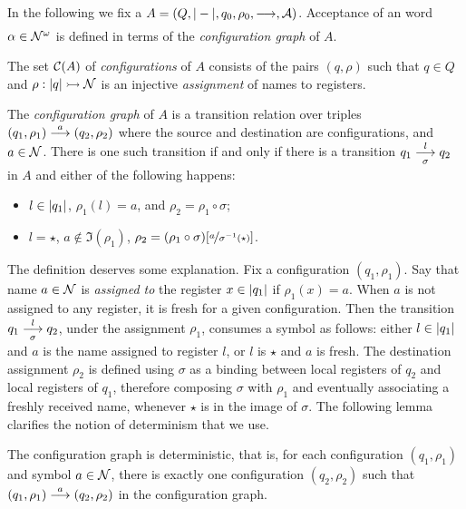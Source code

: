 In the following we fix a \hdma{} $A = (Q,|-|,q_0,\rho_0,\overset{}{\underset{}{\longrightarrow}},\mathcal{A})$. Acceptance of an word $\alpha \in \mathcal{N}^\omega$ is defined in terms of the \emph{configuration graph} of $A$.

\begin{definition}
 The set $\mathcal{C}(A)$ of \emph{configurations} of $A$ consists of the pairs $(q,\rho)$ such that $q \in Q$ and $\rho : |q| \rightarrowtail \mathcal{N}$ is an injective \emph{assignment} of names to registers.
\end{definition}

\begin{definition}
\label{def:config-graph}
 The \emph{configuration graph} of $A$ is a transition relation over triples $(q_1,\rho_1) \overset{a}{\longrightarrow} (q_2,\rho_2)$ where the source and destination are configurations, and $a \in \mathcal{N}$. There is one such transition if and only if there is a transition $q_1 \overset{l}{\underset{\sigma}{\longrightarrow}} q_2$ in $A$ and either of the following happens: 
 \begin{itemize} 
  \item $l \in |q_1|$, $\rho_1(l) = a$, and $\rho_2 = \rho_1 \circ \sigma$;
  \item $l = \star$, $a \notin \Im(\rho_1)$, $\rho_2 = (\rho_1 \circ \sigma)[\nicefrac{a}{\sigma^{-1}(\star)}]$.
 \end{itemize}
\end{definition}
% 
The definition deserves some explanation. Fix a configuration $(q_1,\rho_1)$. Say that name $a\in \mathcal{N}$ is \emph{assigned to} the register $x \in |q_1|$ if $\rho_1(x) = a$. When $a$ is not assigned to any register, it is fresh for a given configuration. Then the transition $q_1 \overset{l}{\underset{\sigma}{\longrightarrow}} q_2$, under the assignment $\rho_1$, consumes a symbol as follows: either $l \in |q_1|$ and $a$ is the name assigned to register $l$, or $l$ is $\star$ and $a$ is fresh. The destination assignment $\rho_2$ is defined using $\sigma$ as a binding between local registers of $q_2$ and local registers of $q_1$, therefore composing $\sigma$ with $\rho_1$ and eventually associating a freshly received name, whenever $\star$ is in the image of $\sigma$. The following lemma clarifies the notion of determinism that we use.

\begin{lemma}\label{lem:deterministic-configuration-graph}
 The configuration graph is deterministic, that is, for each configuration $(q_1,\rho_1)$ and symbol $a \in \mathcal{N}$, there is exactly one configuration $(q_2,\rho_2)$ such that $(q_1,\rho_1) \overset{a}{\longrightarrow} (q_2,\rho_2)$ in the configuration graph.
\end{lemma}

